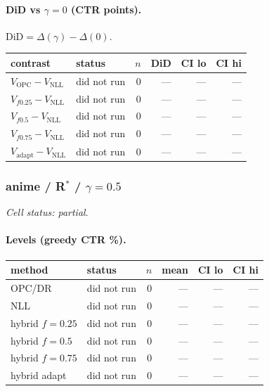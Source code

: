 \documentclass[10pt,a4paper]{article}
\begin{document}
\paragraph{DiD vs $\gamma=0$ (CTR points).} $\mathrm{DiD}=\Delta(\gamma)-\Delta(0)$.
{\centering\small\begin{tabular}{llrrrr}
\toprule contrast & status & $n$ & DiD & CI lo & CI hi \\
\midrule
$V_{\mathrm{OPC}}-V_{\mathrm{NLL}}$ & did not run & 0 & --- & --- & --- \\
$V_{f0.25}-V_{\mathrm{NLL}}$ & did not run & 0 & --- & --- & --- \\
$V_{f0.5}-V_{\mathrm{NLL}}$ & did not run & 0 & --- & --- & --- \\
$V_{f0.75}-V_{\mathrm{NLL}}$ & did not run & 0 & --- & --- & --- \\
$V_{\mathrm{adapt}}-V_{\mathrm{NLL}}$ & did not run & 0 & --- & --- & --- \\
\bottomrule\end{tabular}\par}
\bigskip
\subsubsection{anime / R$^*$ / $\gamma=0.5$}
\emph{Cell status: partial}.
\paragraph{Levels (greedy CTR \%).}
{\centering\small\begin{tabular}{llrrrr}
\toprule method & status & $n$ & mean & CI lo & CI hi \\
\midrule
OPC/DR & did not run & 0 & --- & --- & --- \\
NLL & did not run & 0 & --- & --- & --- \\
hybrid $f{=}0.25$ & did not run & 0 & --- & --- & --- \\
hybrid $f{=}0.5$ & did not run & 0 & --- & --- & --- \\
hybrid $f{=}0.75$ & did not run & 0 & --- & --- & --- \\
hybrid adapt & did not run & 0 & --- & --- & --- \\
\bottomrule\end{tabular}\par}
\end{document}
